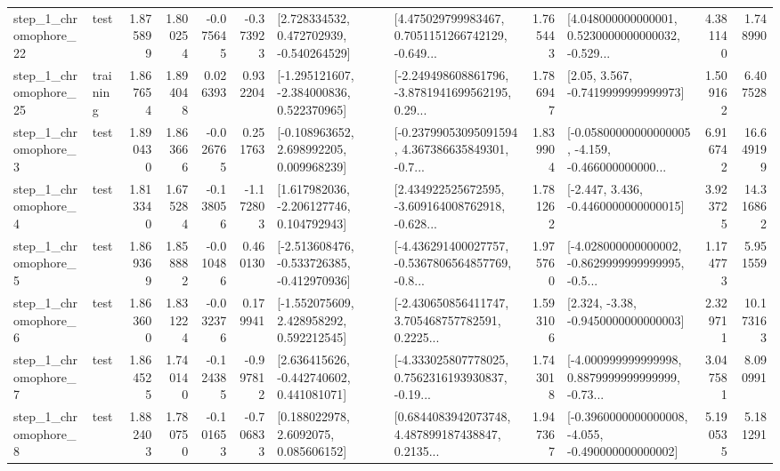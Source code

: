 \begin{tabular}{llrrrrllrlrr}
    step\_1\_chromophore\_22 &      test &      1.875899 &    1.800254 &     -0.075645 & -0.373923 &    [2.728334532, 0.472702939, -0.540264529] &  [4.475029799983467, 0.7051151266742129, -0.649... &       1.765443 &  [4.048000000000001, 0.5230000000000032, -0.529... &            4.381140 &          1.748990 \\
    step\_1\_chromophore\_25 &  training &      1.867654 &    1.894048 &      0.026393 &  0.932204 &   [-1.295121607, -2.384000836, 0.522370965] &  [-2.249498608861796, -3.8781941699562195, 0.29... &       1.786947 &                 [2.05, 3.567, -0.7419999999999973] &            1.509162 &          6.407528 \\
     step\_1\_chromophore\_3 &      test &      1.890430 &    1.863666 &     -0.026765 &  0.251763 &    [-0.108963652, 2.698992205, 0.009968239] &  [-0.23799053095091594, 4.367386635849301, -0.7... &       1.839904 &  [-0.05800000000000005, -4.159, -0.466000000000... &            6.916742 &         16.649199 \\
     step\_1\_chromophore\_4 &      test &      1.813340 &    1.675284 &     -0.138056 & -1.172803 &    [1.617982036, -2.206127746, 0.104792943] &  [2.434922525672595, -3.609164008762918, -0.628... &       1.781262 &               [-2.447, 3.436, -0.4460000000000015] &            3.923725 &         14.316862 \\
     step\_1\_chromophore\_5 &      test &      1.869369 &    1.858882 &     -0.010486 &  0.460130 &  [-2.513608476, -0.533726385, -0.412970936] &  [-4.436291400027757, -0.5367806564857769, -0.8... &       1.975760 &  [-4.028000000000002, -0.8629999999999995, -0.5... &            1.174773 &          5.951559 \\
     step\_1\_chromophore\_6 &      test &      1.863600 &    1.831224 &     -0.032376 &  0.179941 &    [-1.552075609, 2.428958292, 0.592212545] &  [-2.430650856411747, 3.705468757782591, 0.2225... &       1.593106 &                [2.324, -3.38, -0.9450000000000003] &            2.329711 &         10.173163 \\
     step\_1\_chromophore\_7 &      test &      1.864525 &    1.740140 &     -0.124385 & -0.997812 &    [2.636415626, -0.442740602, 0.441081071] &  [-4.333025807778025, 0.7562316193930837, -0.19... &       1.743018 &  [-4.000999999999998, 0.8879999999999999, -0.73... &            3.047581 &          8.090991 \\
     step\_1\_chromophore\_8 &      test &      1.882403 &    1.780750 &     -0.101653 & -0.706833 &       [0.188022978, 2.6092075, 0.085606152] &  [0.6844083942073748, 4.487899187438847, 0.2135... &       1.947367 &  [-0.3960000000000008, -4.055, -0.490000000000002] &            5.190535 &          5.181291 \\

\end{tabular}
